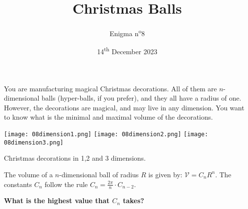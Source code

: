 \documentclass[a4paper, top=10mm]{article}
\title{\textbf{\huge{Christmas Balls}}}
\author{Enigma n\textsuperscript{o}8}
\date{14\textsuperscript{th} December 2023}
\begin{document}
	\maketitle
	
	You are manufacturing magical Christmas decorations.
	All of them  are $n$-dimensional balls (hyper-balls, if you prefer), and they all have a radius of one.
	However, the decorations are magical, and may live in any dimension.
	You want to know what is the minimal and maximal volume of the decorations.
	
	\begin{center}
		\texttt{[image: 08dimension1.png]}	\texttt{[image: 08dimension2.png]}		\texttt{[image: 08dimension3.png]}
		
		Christmas decorations in 1,2 and 3 dimensions.
	\end{center}
	
	The volume of a $n$-dimensional ball of radius $R$ is given by: $\mathcal{V} = C_n R^n$.
	The constants $C_n$ follow the rule $C_n = \frac{2\pi}{n} \cdot C_{n-2}$.
	
	\vspace{1cm}
	
	\textbf{What is the highest value that $C_n$ takes?}
	
\end{document}
